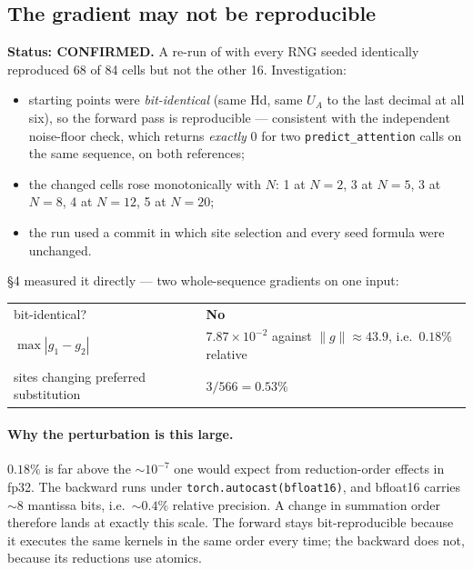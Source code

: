\documentclass[11pt,a4paper]{article}
\begin{document}
\subsection{The gradient may not be reproducible}
\label{sec:repro}

\textbf{Status: CONFIRMED.} A re-run of
 with every RNG seeded identically
reproduced 68 of 84 cells but not the other 16. Investigation:

\begin{itemize}\itemsep2pt
  \item starting points were \emph{bit-identical} (same Hd, same $U_{A}$ to
        the last decimal at all six), so the forward pass is reproducible ---
        consistent with the independent noise-floor check, which returns
        \emph{exactly} $0$ for two \texttt{predict\_attention} calls on the
        same sequence, on both references;
  \item the changed cells rose monotonically with $N$: 1 at $N{=}2$, 3 at
        $N{=}5$, 3 at $N{=}8$, 4 at $N{=}12$, 5 at $N{=}20$;
  \item the run used a commit in which site selection and every seed formula
        were unchanged.
\end{itemize}

\noindent
{} §4 measured it directly --- two
whole-sequence gradients on one input:
\begin{center}
\begin{tabular}{l l}
\toprule
bit-identical? & \textbf{No} \\
$\max|g_{1}-g_{2}|$ & $7.87\times10^{-2}$ against $\|g\| \approx 43.9$,
                      i.e.\ $0.18\%$ relative \\
sites changing preferred substitution & $3/566 = 0.53\%$ \\
\bottomrule
\end{tabular}
\end{center}

\paragraph{Why the perturbation is this large.} $0.18\%$ is far above the
$\sim\!10^{-7}$ one would expect from reduction-order effects in fp32. The
backward runs under \texttt{torch.autocast(bfloat16)}, and bfloat16 carries
$\sim\!8$ mantissa bits, i.e.\ $\sim\!0.4\%$ relative precision. A change in
summation order therefore lands at exactly this scale. The forward stays
bit-reproducible because it executes the same kernels in the same order every
time; the backward does not, because its reductions use atomics.
\end{document}
